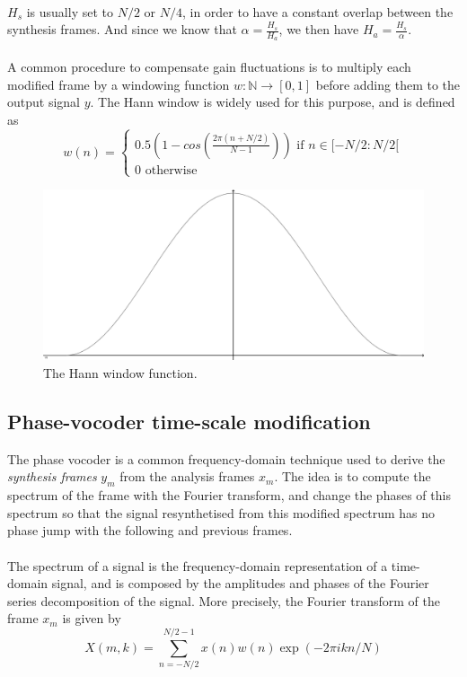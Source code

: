 \documentclass[letterpaper]{article}
\begin{document}
\paragraph{}
\(H_s\) is usually set to \(N/2\) or \(N/4\), in order to have a constant
overlap between the synthesis frames. And since we know that
\(\alpha=\frac{H_s}{H_a}\), we then have \(H_a=\frac{H_s}{\alpha}\).
\paragraph{}
A common procedure to compensate gain fluctuations is to multiply each modified
frame by a windowing function \(w:\mathbb{N}\to[0,1]\) before adding them to the
output signal \(y\). The Hann window is widely used for this purpose, and is
defined as
\[w(n)=\begin{cases}
  0.5(1-cos(\frac{2\pi (n + N/2)}{N-1}))\text{ if }n\in[-N/2:N/2[\\
  0 \text{ otherwise}\end{cases}\]
\begin{figure}[h]
\includegraphics[width=\linewidth]{hann.png}
\caption{The Hann window function.}
\end{figure}

\subsection{Phase-vocoder time-scale modification}
The phase vocoder is a common frequency-domain technique used to derive the
\emph{synthesis frames} \(y_m\)  from the analysis frames \(x_m\). The idea
is to compute the spectrum of the frame with the Fourier transform, and change
the phases of this spectrum so that the signal resynthetised from this modified
spectrum has no phase jump with the following and previous frames.
\paragraph{}The spectrum of a signal is the frequency-domain representation of
a time-domain signal, and is composed by the amplitudes and phases of the
Fourier series decomposition of the signal. More precisely, the Fourier
transform of the frame \(x_m\) is given by
\[X(m,k) = \sum_{n=-N/2}^{N/2-1}x(n)w(n)\exp(-2\pi ikn/N)\]
\end{document}
